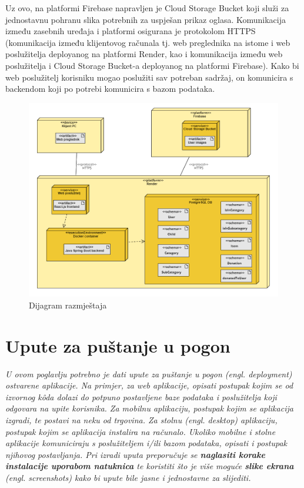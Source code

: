                 Uz ovo, na platformi Firebase napravljen je Cloud Storage Bucket koji služi za jednostavnu pohranu slika potrebnih za uspješan prikaz oglasa. Komunikacija između zasebnih uređaja i platformi osigurana je protokolom HTTPS (komunikacija između klijentovog računala tj. web preglednika na istome i web poslužitelja deployanog na platformi Render, kao i komunikacija između web poslužitelja i Cloud Storage Bucket-a deployanog na platformi Firebase). Kako bi web poslužitelj korisniku mogao poslužiti sav potreban sadržaj, on komunicira s backendom koji po potrebi komunicira s bazom podataka.

                \begin{figure}[H]
				\includegraphics[width=\textwidth,height=0.8\textheight]{dijagrami/Dijagram razmjestaja.png}
				\centering
				\caption{Dijagram razmještaja}
				\label{fig:DeploymentDiagram}
			\end{figure}
			
			\eject 
		
		\section{Upute za puštanje u pogon}
		
		
			 \textit{U ovom poglavlju potrebno je dati upute za puštanje u pogon (engl. deployment) ostvarene aplikacije. 
			 Na primjer, za web aplikacije, opisati postupak kojim se od izvornog kôda dolazi do potpuno postavljene baze podataka i poslužitelja koji odgovara na upite korisnika. 
			 Za mobilnu aplikaciju, postupak kojim se aplikacija izgradi, te postavi na neku od trgovina. Za stolnu (engl. desktop) aplikaciju, postupak kojim se aplikacija instalira na računalo. 
			 Ukoliko mobilne i stolne aplikacije komuniciraju s poslužiteljem i/ili bazom podataka, opisati i postupak njihovog postavljanja. 
			 Pri izradi uputa preporučuje se \textbf{naglasiti korake instalacije uporabom natuknica} te koristiti što je više moguće \textbf{slike ekrana} (engl. screenshots) kako bi upute bile jasne i jednostavne za slijediti.}
			

